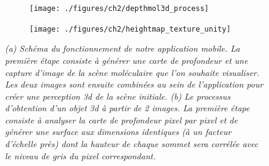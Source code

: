 \begin{figure}
\begin{subfigure}
  \centering
  {\texttt{[image: ./figures/ch2/depthmol3d\_process]}}
    \caption{}
  \label{Fig:pymol_stereo}
\end{subfigure}
\begin{subfigure}
  \centering
  {\texttt{[image: ./figures/ch2/heightmap\_texture\_unity]}}
    \caption{}
  \label{Fig:heightmap_texture_unity}
\end{subfigure}
\caption{{\it (a) Schéma du fonctionnement de notre application mobile. La première étape consiste à générer une carte de profondeur et une capture d'image de la scène moléculaire que l'on souhaite visualiser. Les deux images sont ensuite combinées au sein de l'application pour créer une perception 3d de la scène initiale.
(b) Le processus d'obtention d'un objet 3d à partir de 2 images. La première étape consiste à analyser la carte de profondeur pixel par pixel et de générer une surface aux dimensions identiques (à un facteur d'échelle près) dont la hauteur de chaque sommet sera corrélée avec le niveau de gris du pixel correspondant.}}
\end{figure}

